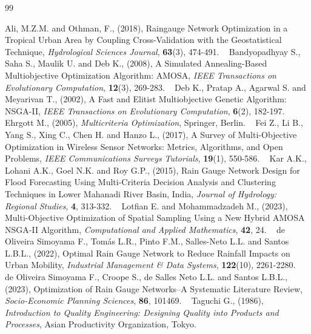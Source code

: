 \documentclass[twoside]{article}
\begin{document}
\begin{thebibliography}{99}
 
Ali, M.Z.M. and Othman, F., (2018), Raingauge Network Optimization in a Tropical Urban Area by Coupling Cross-Validation with the Geostatistical Technique, {\it Hydrological Sciences Journal}, \textbf{63}(3), 474-491.
 
Bandyopadhyay S., Saha S., Maulik U. and Deb K., (2008), A Simulated Annealing-Based Multiobjective Optimization Algorithm: AMOSA, {\it IEEE Transactions on Evolutionary Computation}, \textbf{12}(3), 269-283.
 
Deb K., Pratap A., Agarwal S. and Meyarivan T., (2002), A Fast and Elitist Multiobjective Genetic Algorithm: NSGA-II, {\it IEEE Transactions on Evolutionary Computation}, \textbf{6}(2), 182-197.
 
Ehrgott M., (2005), {\it Multicriteria Optimization}, Springer, Berlin.
 
Fei Z., Li B., Yang S., Xing C., Chen H. and Hanzo L., (2017), A Survey of Multi-Objective Optimization in Wireless Sensor Networks: Metrics, Algorithms, and Open Problems, {\it IEEE Communications Surveys Tutorials}, \textbf{19}(1), 550-586.
 
Kar A.K., Lohani A.K., Goel N.K. and Roy G.P., (2015), Rain Gauge Network Design for Flood Forecasting Using Multi-Criteria Decision Analysis and Clustering Techniques in Lower Mahanadi River Basin, India, {\it Journal of Hydrology: Regional Studies}, \textbf{4}, 313-332.
 
Lotfian E. and Mohammadzadeh M., (2023), Multi-Objective Optimization of Spatial Sampling Using a New Hybrid AMOSA NSGA-II Algorithm, {\it Computational and Applied Mathematics}, \textbf{42}, 24.
 
de Oliveira Simoyama F., Tom\'{a}s L.R., Pinto F.M., Salles-Neto L.L. and Santos L.B.L., (2022), Optimal Rain Gauge Network to Reduce Rainfall Impacts on Urban Mobility, {\it Industrial Management \& Data Systems}, \textbf{122}(10), 2261-2280.
 
de Oliveira Simoyama F., Croope S., de Salles Neto L.L. and Santos L.B.L., (2023), Optimization of Rain Gauge Networks--A Systematic Literature Review, {\it Socio-Economic Planning Sciences}, \textbf{86}, 101469.
 
Taguchi G., (1986), {\it Introduction to Quality Engineering: Designing Quality into Products and Processes}, Asian Productivity Organization, Tokyo.

\end{thebibliography}
\end{document}
